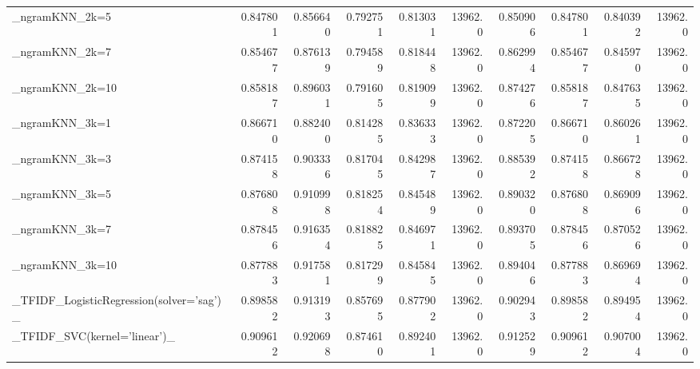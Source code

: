 \begin{tabular}{lrrrrrrrrr}
\_ngramKNN\_2k=5                                     &  0.847801 &         0.856640 &      0.792751 &        0.813031 &        13962.0 &            0.850906 &         0.847801 &           0.840392 &           13962.0 \\
\_ngramKNN\_2k=7                                     &  0.854677 &         0.876139 &      0.794589 &        0.818448 &        13962.0 &            0.862994 &         0.854677 &           0.845970 &           13962.0 \\
\_ngramKNN\_2k=10                                    &  0.858187 &         0.896031 &      0.791605 &        0.819099 &        13962.0 &            0.874276 &         0.858187 &           0.847635 &           13962.0 \\
\_ngramKNN\_3k=1                                     &  0.866710 &         0.882400 &      0.814285 &        0.836333 &        13962.0 &            0.872205 &         0.866710 &           0.860261 &           13962.0 \\
\_ngramKNN\_3k=3                                     &  0.874158 &         0.903336 &      0.817045 &        0.842987 &        13962.0 &            0.885392 &         0.874158 &           0.866728 &           13962.0 \\
\_ngramKNN\_3k=5                                     &  0.876808 &         0.910998 &      0.818254 &        0.845489 &        13962.0 &            0.890320 &         0.876808 &           0.869096 &           13962.0 \\
\_ngramKNN\_3k=7                                     &  0.878456 &         0.916354 &      0.818825 &        0.846971 &        13962.0 &            0.893705 &         0.878456 &           0.870526 &           13962.0 \\
\_ngramKNN\_3k=10                                    &  0.877883 &         0.917581 &      0.817299 &        0.845845 &        13962.0 &            0.894046 &         0.877883 &           0.869694 &           13962.0 \\
\_TFIDF\_LogisticRegression(solver='sag')\_           &  0.898582 &         0.913193 &      0.857695 &        0.877902 &        13962.0 &            0.902943 &         0.898582 &           0.894954 &           13962.0 \\
\_TFIDF\_SVC(kernel='linear')\_                       &  0.909612 &         0.920698 &      0.874610 &        0.892401 &        13962.0 &            0.912529 &         0.909612 &           0.907004 &           13962.0 \\

\end{tabular}
